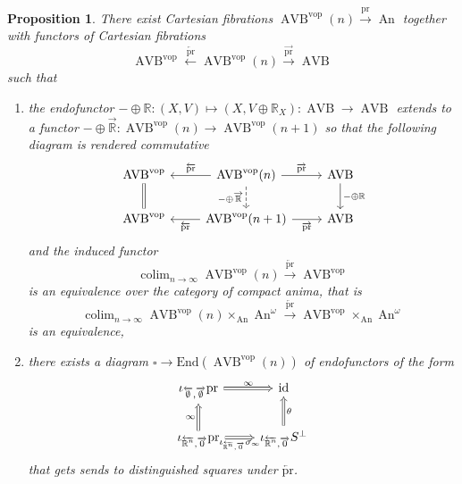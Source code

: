 \documentclass{article}
\newcommand{\xto}{\xrightarrow}
\newcommand{\R}{\mathbb{R}} %
\newcommand{\vop}{\mathrm{vop}}
\newcommand{\pr}{\mathrm{pr}}
\newcommand{\id}{\mathrm{id}}
\DeclareMathOperator{\AVB}{AVB}
\DeclareMathOperator{\An}{An}
\DeclareMathOperator*{\colim}{colim}
\newtheorem{proposition}{Proposition}
\begin{document}
\begin{proposition}\label{prop: AVB(n)}
 There exist Cartesian fibrations $\AVB^\vop(n) \xto{\pr} \An$ together with functors of 
 Cartesian fibrations 
 \[
   \AVB^\vop \xleftarrow{\overleftarrow{\pr}} \AVB^\vop(n) \xrightarrow{\overrightarrow{\pr}} \AVB 
 \]
 such that
 \begin{enumerate}
    \item the endofunctor $- \oplus \R \colon (X,V) \mapsto (X, V \oplus \R_X) \colon \AVB \to \AVB$ extends to a
    functor $- \oplus \overrightarrow{\R} \colon \AVB^\vop(n) \to \AVB^\vop(n + 1)$ so that the following diagram is 
    rendered commutative 
    \[\begin{tikzcd}
        {\AVB^\vop} & {\AVB^\vop(n)} & \AVB \\
        {\AVB^\vop} & {\AVB^\vop(n + 1)} & \AVB
        \arrow["{ -\oplus\overrightarrow{\R}}"', dashed, from=1-2, to=2-2]
        \arrow["{\overrightarrow{\pr}}", from=1-2, to=1-3]
        \arrow["{\overrightarrow{\pr}}"', from=2-2, to=2-3]
        \arrow["{ - \oplus \R}", from=1-3, to=2-3]
        \arrow["{\overleftarrow{\pr}}"', from=1-2, to=1-1]
        \arrow["{\overleftarrow{\pr}}", from=2-2, to=2-1]
        \arrow[Rightarrow, no head, from=1-1, to=2-1]
        \label{}
    \end{tikzcd}\]
    and the induced functor 
    \[
      \colim_{n \to \infty} \AVB^\vop(n) \xto{\overleftarrow{\pr}} \AVB^\vop   
    \]
    is an equivalence over the category of compact anima, that is 
    \[
        \colim_{n \to \infty} \AVB^\vop(n) \times_{\An} \An^\omega \xto{\overleftarrow{\pr}} \AVB^\vop \times_{\An} \An^\omega
    \]
    is an equivalence, 
    \item there exists a diagram $\square \to \mathrm{End}(\AVB^\vop(n))$ of endofunctors  of the form 
    \begin{equation}
        \begin{tikzcd}
        {\iota_{\overleftarrow{\emptyset},\overrightarrow{\emptyset}}\pr} & \id \\
        {\iota_{\overleftarrow{\R^n},\overrightarrow{0}}\pr} & {\iota_{\overleftarrow{\R^n},\overrightarrow{0}}S^\perp}
        \arrow["\infty", Rightarrow, from=2-1, to=1-1]
        \arrow["\infty", Rightarrow, from=1-1, to=1-2]
        \arrow["{\iota_{\overleftarrow{\R^n},\overrightarrow{0}}\sigma_\infty}"', Rightarrow, from=2-1, to=2-2]
        \arrow["\theta"', Rightarrow, from=2-2, to=1-2]
    \end{tikzcd}
    \label{fig:endosquareavb(n)}
\end{equation}
    that gets sends to distinguished squares under $\overleftarrow{\pr}$.
 \end{enumerate}
\end{proposition}
\end{document}
